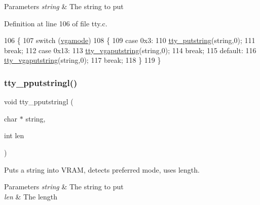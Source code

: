 \begin{DoxyParams}{Parameters}
{\em string} & The string to put \\
\hline
\end{DoxyParams}


Definition at line 106 of file tty.\+c.


\begin{DoxyCode}
106                                   \{
107     \textcolor{keywordflow}{switch} (\hyperlink{a00179_af93b0649fdd1bea5b6d29ed37205aa2c_af93b0649fdd1bea5b6d29ed37205aa2c}{vgamode})
108     \{
109     \textcolor{keywordflow}{case} 0x3:
110         \hyperlink{a00179_a5b5bf610a57f3c59b2851fa2652081ec_a5b5bf610a57f3c59b2851fa2652081ec}{tty\_putstring}(\textcolor{keywordtype}{string},0);
111         \textcolor{keywordflow}{break};
112     \textcolor{keywordflow}{case} 0x13:
113         \hyperlink{a00179_a05ca3f5e64f38fec173b635ca8465415_a05ca3f5e64f38fec173b635ca8465415}{tty\_vgaputstring}(\textcolor{keywordtype}{string},0);
114         \textcolor{keywordflow}{break};
115     \textcolor{keywordflow}{default}:
116         \hyperlink{a00179_a05ca3f5e64f38fec173b635ca8465415_a05ca3f5e64f38fec173b635ca8465415}{tty\_vgaputstring}(\textcolor{keywordtype}{string},0);
117         \textcolor{keywordflow}{break};
118     \}
119 \}
\end{DoxyCode}
\mbox{\label{a00179_abaf93f9e56ddb7b10462070f59e534e4_abaf93f9e56ddb7b10462070f59e534e4}} 
\subsubsection{\texorpdfstring{tty\+\_\+pputstringl()}{tty\_pputstringl()}}
{\footnotesize\ttfamily void tty\+\_\+pputstringl (\begin{DoxyParamCaption}\item[{char $\ast$}]{string,  }\item[{int}]{len }\end{DoxyParamCaption})}



Puts a string into V\+R\+AM, detects preferred mode, uses length. 


\begin{DoxyParams}{Parameters}
{\em string} & The string to put \\
\hline
{\em len} & The length \\
\hline
\end{DoxyParams}


